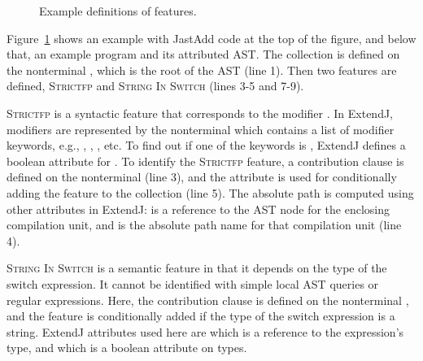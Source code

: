 \begin{figure}[ht]
\caption{\label{fig:featureExample}Example definitions of features.}
\end{figure}

Figure~\ref{fig:featureExample} shows an example with JastAdd code at the top of the figure, and below that, an example program and its attributed AST.
The  collection is defined on the nonterminal , which is the root of the AST (line 1). Then two features are defined, \textsc{Strictfp} and \textsc{String In Switch} (lines 3-5 and 7-9).

\textsc{Strictfp} is a syntactic feature that corresponds to the modifier .
In ExtendJ, modifiers are represented by the nonterminal  which contains a list of modifier keywords, e.g., , , , etc.
To find out if one of the keywords is , ExtendJ defines a boolean attribute  for .
To identify the \textsc{Strictfp} feature, a contribution clause is defined on the nonterminal  (line 3), and the  attribute is used for conditionally adding the feature to the collection (line 5).
The absolute path is computed using other attributes in ExtendJ:  is a reference to the AST node for the enclosing compilation unit, and  is the absolute path name for that compilation unit (line 4).

\textsc{String In Switch} is a semantic feature in that it depends on the type of the switch expression. It cannot be identified with simple local AST queries or regular expressions. Here, the contribution clause is defined on the nonterminal , and the feature is conditionally added if the type of the switch expression is a string. ExtendJ attributes used here are  which is a reference to the expression's type, and  which is a boolean attribute on types.





